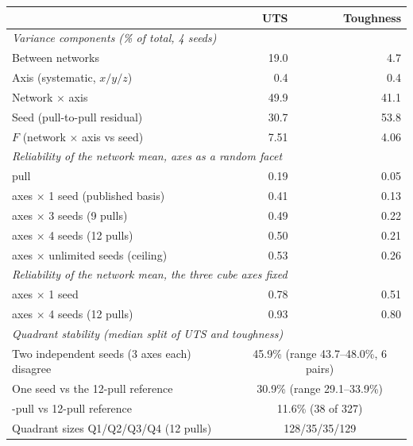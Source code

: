 \begin{tabular}{lrr}
\toprule
 & UTS & Toughness \\
\midrule
\multicolumn{3}{l}{\emph{Variance components (\% of total, 4 seeds)}} \\
\quad Between networks & 19.0 & 4.7 \\
\quad Axis (systematic, $x/y/z$) & 0.4 & 0.4 \\
\quad Network $\times$ axis & 49.9 & 41.1 \\
\quad Seed (pull-to-pull residual) & 30.7 & 53.8 \\
\quad $F$ (network $\times$ axis vs seed) & 7.51 & 4.06 \\
\midrule
\multicolumn{3}{l}{\emph{Reliability of the network mean, axes as a random facet}} \\
\quad 1 pull & 0.19 & 0.05 \\
\quad 3 axes $\times$ 1 seed (published basis) & 0.41 & 0.13 \\
\quad 3 axes $\times$ 3 seeds (9 pulls) & 0.49 & 0.22 \\
\quad 3 axes $\times$ 4 seeds (12 pulls) & 0.50 & 0.21 \\
\quad 3 axes $\times$ unlimited seeds (ceiling) & 0.53 & 0.26 \\
\multicolumn{3}{l}{\emph{Reliability of the network mean, the three cube axes fixed}} \\
\quad 3 axes $\times$ 1 seed & 0.78 & 0.51 \\
\quad 3 axes $\times$ 4 seeds (12 pulls) & 0.93 & 0.80 \\
\midrule
\multicolumn{3}{l}{\emph{Quadrant stability (median split of UTS and toughness)}} \\
\quad Two independent seeds (3 axes each) disagree & \multicolumn{2}{c}{45.9\% (range 43.7--48.0\%, 6 pairs)} \\
\quad One seed vs the 12-pull reference & \multicolumn{2}{c}{30.9\% (range 29.1--33.9\%)} \\
\quad 9-pull vs 12-pull reference & \multicolumn{2}{c}{11.6\% (38 of 327)} \\
\quad Quadrant sizes Q1/Q2/Q3/Q4 (12 pulls) & \multicolumn{2}{c}{128/35/35/129} \\
\bottomrule
\end{tabular}
